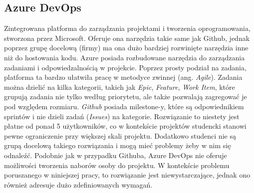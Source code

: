 \subsection{Azure DevOps}
Zintegrowana platforma do zarządzania projektami i tworzenia oprogramowania, stworzona przez Microsoft. Oferuje ona narzędzia takie same jak Github, jednak poprzez grupę docelową (firmy) ma ona dużo bardziej rozwinięte narzędzia inne niż do hostowania kodu.
Azure posiada rozbudowane narzędzia do zarządzania zadaniami i odpowiedzalnością w projekcie. Poprzez prosty podział na zadania, platforma ta bardzo ułatwiła pracę w metodyce zwinnej (ang. \textit{Agile}).
Zadania można dzielić na kilka kategorii, takich jak \textit{Epic}, \textit{Feature}, \textit{Work Item}, które grupują zadania nie tylko według priorytetu, ale także pozwalają zagregować 
je pod względem rozmiaru. \textit{Github} posiada milestone-y, które są odpowiednikiem sprintów i nie dzieli zadań (\textit{Issues}) na kategorie. Rozwiązanie to niestety
jest płatne od ponad 5 użytkowników, co w kontekście projektów studencki stanowi pewne ograniczenie przy większej skali projektu. Dodatkowo studenci nie są grupą docelową takiego rozwiązania i mogą mieć problemy żeby w nim się odnaleźć.
Podobnie jak w przypadku Githuba, Azure DevOps nie oferuje możliwości tworzenia naborów osoby do projektu. W kontekście problemu poruszanego w niniejszej pracy, to rozwiązanie jest niewystarczające, jednak ono również adresuje dużo zdefiniowanych wymagań.
